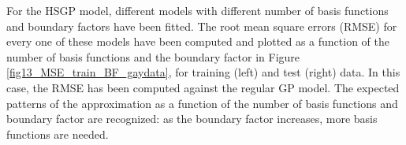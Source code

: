 \documentclass[]{interact}
\theoremstyle{plain}%
\theoremstyle{definition}
\theoremstyle{remark}
\begin{document}
For the HSGP model, different models with different number of basis functions and boundary factors have been fitted. The root mean square errors (RMSE) for every one of these models have been computed and plotted as a function of the number of basis functions and the boundary factor in Figure \ref{fig13_MSE_train_BF_gaydata}, for training (left) and test (right) data. In this case, the RMSE has been computed against the regular GP model. The expected patterns of the approximation as a function of the number of basis functions and boundary factor are recognized: as the boundary factor increases, more basis functions are needed.

\begin{figure}
\centering
{}

\end{figure}
\end{document}
